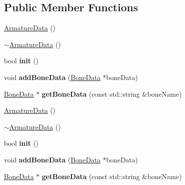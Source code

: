 \subsection*{Public Member Functions}
\begin{DoxyCompactItemize}
\item 
\hyperlink{classcocostudio_1_1ArmatureData_ad1337e328d9ed97b442eb85d7705d2c9}{Armature\+Data} ()
\item 
\hyperlink{classcocostudio_1_1ArmatureData_a2e5125cb6a74ae4ac4445f026bdcf5e1}{$\sim$\+Armature\+Data} ()
\item 
\mbox{\label{classcocostudio_1_1ArmatureData_a2be6e29cef33b12caf9d523afaa615df}} 
bool {\bfseries init} ()
\item 
\mbox{\label{classcocostudio_1_1ArmatureData_a62ea09071d1da0bec7501d08202d18df}} 
void {\bfseries add\+Bone\+Data} (\hyperlink{classcocostudio_1_1BoneData}{Bone\+Data} $\ast$bone\+Data)
\item 
\mbox{\label{classcocostudio_1_1ArmatureData_a1e8123a3ead714a39484299a0279dffb}} 
\hyperlink{classcocostudio_1_1BoneData}{Bone\+Data} $\ast$ {\bfseries get\+Bone\+Data} (const std\+::string \&bone\+Name)
\item 
\hyperlink{classcocostudio_1_1ArmatureData_ad1337e328d9ed97b442eb85d7705d2c9}{Armature\+Data} ()
\item 
\hyperlink{classcocostudio_1_1ArmatureData_a2e5125cb6a74ae4ac4445f026bdcf5e1}{$\sim$\+Armature\+Data} ()
\item 
\mbox{\label{classcocostudio_1_1ArmatureData_a2be6e29cef33b12caf9d523afaa615df}} 
bool {\bfseries init} ()
\item 
\mbox{\label{classcocostudio_1_1ArmatureData_a62ea09071d1da0bec7501d08202d18df}} 
void {\bfseries add\+Bone\+Data} (\hyperlink{classcocostudio_1_1BoneData}{Bone\+Data} $\ast$bone\+Data)
\item 
\mbox{\label{classcocostudio_1_1ArmatureData_a9074297be57a8d909bc3ba12d4c3d6a4}} 
\hyperlink{classcocostudio_1_1BoneData}{Bone\+Data} $\ast$ {\bfseries get\+Bone\+Data} (const std\+::string \&bone\+Name)
\end{DoxyCompactItemize}
